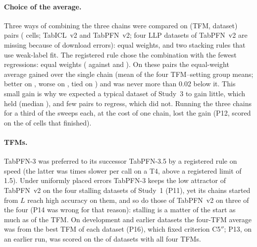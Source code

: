 \paragraph{Choice of the average.} Three ways of combining the three chains were compared on 
(TFM, dataset) pairs ( cells; TabICL~v2 and TabPFN~v2; four LLP datasets of TabPFN~v2 are missing
because of download errors): equal weights, and two stacking rules that use weak-label fit. The registered rule chose
the combination with the fewest regressions: equal weights ( against  and
). On these pairs the equal-weight average gained  over the single chain (mean of the four
TFM--setting group means; better on , worse on , tied on ) and was never more than 0.02 below
it. This small gain is why we expected a typical dataset of Study~3 to gain little, which held (median
), and few pairs to regress, which did not. Running the three chains for a third of the sweeps each, at the cost of one chain, lost the gain (P12, scored on
the  of  cells that finished).

\paragraph{TFMs.} TabPFN-3 was preferred to its successor TabPFN-3.5 by a registered rule on speed (the latter was
 times slower per call on a T4, above a registered limit of 1.5). Under uniformly placed errors TabPFN-3 keeps the low attractor of
TabPFN~v2 on the four stalling datasets of Study~1 (P11), yet its chains started from $L$ reach high accuracy on them,
and so do those of TabPFN~v2 on three of the four (P14 was wrong for that reason): stalling is a matter of the start as
much as of the TFM. On  development and earlier datasets the four-TFM average was  from the best TFM
of each dataset (P16), which fixed criterion C5$''$; P13, on an earlier run, was scored on the  of
 datasets with all four TFMs.

